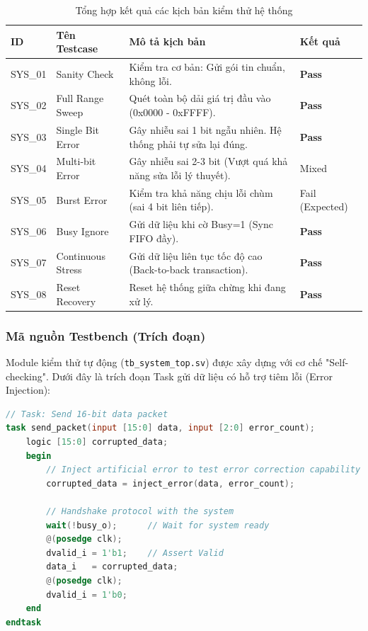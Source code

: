 \documentclass[12pt,a4paper]{report}
\begin{document}
\begin{table}[H]
    \centering
    \caption{Tổng hợp kết quả các kịch bản kiểm thử hệ thống}
    \begin{tabularx}{\textwidth}{|l|l|X|l|}
    \hline
    \textbf{ID} & \textbf{Tên Testcase} & \textbf{Mô tả kịch bản} & \textbf{Kết quả} \\ \hline
    SYS\_01 & Sanity Check & Kiểm tra cơ bản: Gửi gói tin chuẩn, không lỗi. & \textbf{Pass} \\ \hline
    SYS\_02 & Full Range Sweep & Quét toàn bộ dải giá trị đầu vào (0x0000 - 0xFFFF). & \textbf{Pass} \\ \hline
    SYS\_03 & Single Bit Error & Gây nhiễu sai 1 bit ngẫu nhiên. Hệ thống phải tự sửa lại đúng. & \textbf{Pass} \\ \hline
    SYS\_04 & Multi-bit Error & Gây nhiễu sai 2-3 bit (Vượt quá khả năng sửa lỗi lý thuyết). & Mixed \\ \hline
    SYS\_05 & Burst Error & Kiểm tra khả năng chịu lỗi chùm (sai 4 bit liên tiếp). & Fail (Expected) \\ \hline
    SYS\_06 & Busy Ignore & Gửi dữ liệu khi cờ Busy=1 (Sync FIFO đầy). & \textbf{Pass} \\ \hline
    SYS\_07 & Continuous Stress & Gửi dữ liệu liên tục tốc độ cao (Back-to-back transaction). & \textbf{Pass} \\ \hline
    SYS\_08 & Reset Recovery & Reset hệ thống giữa chừng khi đang xử lý. & \textbf{Pass} \\ \hline
    \end{tabularx}
\end{table}

\subsubsection{Mã nguồn Testbench (Trích đoạn)}

Module kiểm thử tự động (\texttt{tb\_system\_top.sv}) được xây dựng với cơ chế "Self-checking". Dưới đây là trích đoạn Task gửi dữ liệu có hỗ trợ tiêm lỗi (Error Injection):

\begin{lstlisting}[language=Verilog, caption=Task gửi dữ liệu và tiêm lỗi trong Testbench]
// Task: Send 16-bit data packet
task send_packet(input [15:0] data, input [2:0] error_count);
    logic [15:0] corrupted_data;
    begin
        // Inject artificial error to test error correction capability
        corrupted_data = inject_error(data, error_count);
        
        // Handshake protocol with the system
        wait(!busy_o);      // Wait for system ready
        @(posedge clk);
        dvalid_i = 1'b1;    // Assert Valid
        data_i   = corrupted_data;
        @(posedge clk);
        dvalid_i = 1'b0;
    end
endtask
\end{lstlisting}
\end{document}
